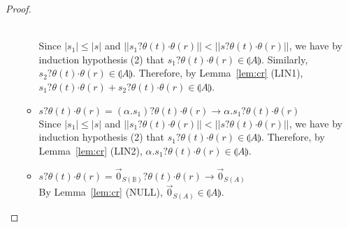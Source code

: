 \documentclass[preprint]{elsarticle}
\newcommand\interp[1]{\llparenthesis #1\rrparenthesis}
\newcommand\size[1]{||#1||}
\newcommand\lpl[1]{|#1|}
\newcommand\B{\ensuremath{\mathbb B}}
\newcommand\ite[3]{{#1}?{#2}\mathord{\cdot}{#3}}
\newcommand\z[1][A]{\vec 0_{S(#1)}}
\newcommand\nullvec[1]{\z[#1]}
\newcommand{\reducesto}{\rightarrow}
\begin{document}
\begin{proof}
\begin{itemize}
\begin{itemize}
      \\ Since \( \lpl{s_1} \leq \lpl{s} \) and \( \size{\ite{s_1}{\theta(t)}{\theta(r)}} < \size{\ite{s}{\theta(t)}{\theta(r)}} \), we have by induction hypothesis (2) that \( \ite{s_1}{\theta(t)}{\theta(r)} \in \interp{A} \). Similarly, \( \ite{s_2}{\theta(t)}{\theta(r)} \in \interp{A} \). Therefore, by Lemma~\ref{lem:cr} (LIN1), \( \ite{s_1}{\theta(t)}{\theta(r)} + \ite{s_2}{\theta(t)}{\theta(r)} \in \interp{A} \).
    \item \( \ite{s}{\theta(t)}{\theta(r)} = \ite{(\alpha . s_1)}{\theta(t)}{\theta(r)} \reducesto \alpha . \ite{s_1}{\theta(t)}{\theta(r)} \)
      \\ Since \( \lpl{s_1} \leq \lpl{s} \) and \( \size{\ite{s_1}{\theta(t)}{\theta(r)}} < \size{\ite{s}{\theta(t)}{\theta(r)}} \), we have by induction hypothesis (2) that \( \ite{s_1}{\theta(t)}{\theta(r)} \in \interp{A} \). Therefore, by Lemma~\ref{lem:cr} (LIN2), \( \alpha . \ite{s_1}{\theta(t)}{\theta(r)} \in \interp{A} \).
    \item \( \ite{s}{\theta(t)}{\theta(r)} = \ite{\nullvec{\B}}{\theta(t)}{\theta(r)} \reducesto \nullvec{A} \)
      \\ By Lemma~\ref{lem:cr} (NULL), \( \nullvec{A} \in \interp{A} \).
    \end{itemize}


\end{itemize}
\end{proof}
\end{document}

